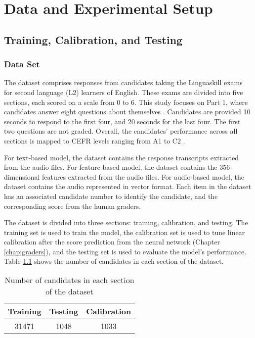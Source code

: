 \chapter{Data and Experimental Setup} \label{chap:setup}

\section{Training, Calibration, and Testing}

\subsection{Data Set} \label{sec:data_construction}
The dataset comprises responses from candidates taking the Linguaskill exams for second language (L2)  learners of English. These exams are divided into five sections, each scored on a scale from 0 to 6. This study focuses on Part 1, where candidates answer eight questions about themselves \cite{linguaskills}. Candidates are provided 10 seconds to respond to the first four, and 20 seconds for the last four. The first two questions are not graded. Overall, the candidates' performance across all sections is mapped to CEFR levels ranging from A1 to C2 \cite{CEFR}.

For text-based model, the dataset contains the response transcripts extracted from the audio files. For feature-based model, the dataset contains the 356-dimensional features extracted from the audio files. For audio-based model, the dataset contains the audio represented in vector format. Each item in the dataset has an associated candidate number to identify the candidate, and the corresponding score from the human graders.

The dataset is divided into three sections: training, calibration, and testing. The training set is used to train the model, the calibration set is used to tune linear calibration after the score prediction from the neural network (Chapter \ref{chap:graders}), and the testing set is used to evaluate the model's performance. Table \ref{tab:data_size} shows the number of candidates in each section of the dataset.

\begin{table}[H]
    \centering
    \begin{tabular}{|c|c|c|}
        \hline
        \textbf{Training} & \textbf{Testing} & \textbf{Calibration} \\ \hline
        31471             & 1048             & 1033                 \\ \hline
    \end{tabular}
    \caption{Number of candidates in each section of the dataset}
    \label{tab:data_size}
\end{table}

